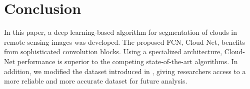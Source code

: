 \documentclass{article}
\begin{document}
\vspace{-2mm}
\section{Conclusion}
In this paper, a deep learning-based algorithm for segmentation of clouds in remote sensing images was developed. The proposed FCN, Cloud-Net, benefits from sophisticated convolution blocks. Using a specialized architecture, Cloud-Net performance is superior to the competing state-of-the-art algorithms. In addition, we modified the dataset introduced in \cite{mymmsp}, giving researchers access to a more reliable and more accurate dataset for future analysis.




\vspace{-5mm}


\end{document}
